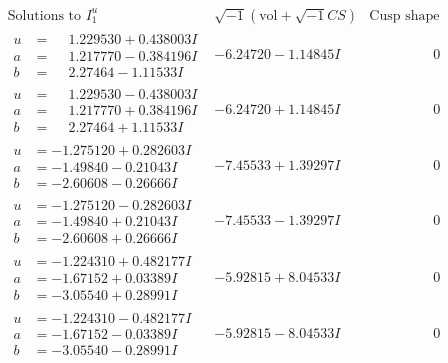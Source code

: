 \documentclass[1p]{elsarticle_modified}
\theoremstyle{definition}
\newcommand{\I}{\sqrt{-1}}
\begin{document}
$$\begin{array}{c|c|c}
 \end{array}$$\newpage$$\begin{array}{c|c|c}  
\text{Solutions to }I^u_{1}& \I (\text{vol} + \sqrt{-1}CS) & \text{Cusp shape}\\
 \hline 
\begin{aligned}
u &= \phantom{-}1.229530 + 0.438003 I \\
a &= \phantom{-}1.217770 - 0.384196 I \\
b &= \phantom{-}2.27464 - 1.11533 I\end{aligned}
 & -6.24720 - 1.14845 I & \phantom{-0.000000 } 0 \\ \hline\begin{aligned}
u &= \phantom{-}1.229530 - 0.438003 I \\
a &= \phantom{-}1.217770 + 0.384196 I \\
b &= \phantom{-}2.27464 + 1.11533 I\end{aligned}
 & -6.24720 + 1.14845 I & \phantom{-0.000000 } 0 \\ \hline\begin{aligned}
u &= -1.275120 + 0.282603 I \\
a &= -1.49840 - 0.21043 I \\
b &= -2.60608 - 0.26666 I\end{aligned}
 & -7.45533 + 1.39297 I & \phantom{-0.000000 } 0 \\ \hline\begin{aligned}
u &= -1.275120 - 0.282603 I \\
a &= -1.49840 + 0.21043 I \\
b &= -2.60608 + 0.26666 I\end{aligned}
 & -7.45533 - 1.39297 I & \phantom{-0.000000 } 0 \\ \hline\begin{aligned}
u &= -1.224310 + 0.482177 I \\
a &= -1.67152 + 0.03389 I \\
b &= -3.05540 + 0.28991 I\end{aligned}
 & -5.92815 + 8.04533 I & \phantom{-0.000000 } 0 \\ \hline\begin{aligned}
u &= -1.224310 - 0.482177 I \\
a &= -1.67152 - 0.03389 I \\
b &= -3.05540 - 0.28991 I\end{aligned}
 & -5.92815 - 8.04533 I & \phantom{-0.000000 } 0 \\ \hline\begin{aligned}

\end{aligned}
\end{array}$$
\end{document}
